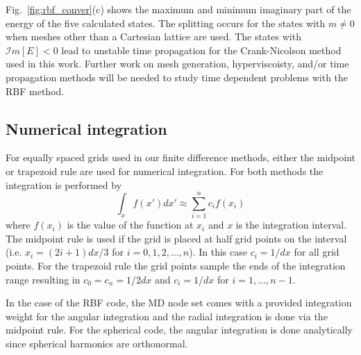 Fig.~\ref{fig:rbf_conver}(c) shows the maximum and minimum imaginary part of the energy of the five calculated states. The splitting occurs for the states with $m\ne0$ when meshes other than a Cartesian  lattice are used. The states with $\mathcal{I}m[E]<0$ lead to unstable time propagation for the Crank-Nicolson method used in this work. Further work on mesh generation, hyperviscoisty, and/or time propagation methods will be needed to study time dependent problems with the RBF method.



\subsection{Numerical integration} %
\label{sub:numerical_integration}
For equally spaced grids used in our finite difference methods, either the midpoint or trapezoid rule are used for numerical integration. For both methods the integration is performed by 
\begin{equation}
    \int_{x} f(x')dx' \approx \sum_{i=1}^n c_i f(x_i)
\end{equation}
where $f(x_i)$ is the value of the function at $x_i$ and $x$ is the integration interval. The midpoint rule is used if the grid is placed at half grid points on the interval (i.e. $x_i = (2i+1)dx/3$ for $i=0,1,2,...,n$). In this case $c_i = 1/dx$ for all grid points. For the trapezoid rule the grid points sample the ends of the integration range resulting in $c_0 = c_n = 1/2dx$ and $c_i = 1/dx$ for $i=1, \ldots, n-1$. 

In the case of the RBF code, the MD node set comes with a provided integration weight for the angular integration and the radial integration is done via the midpoint rule. 
For the spherical code, the angular integration is done analytically since spherical harmonics are orthonormal.

